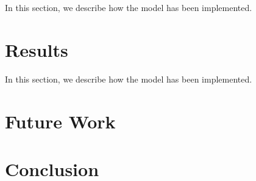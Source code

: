 \documentclass[11pt,headings=small]{scrartcl}
\begin{document}
In this section, we describe how the model has been implemented.

\section{Results}
\label{section:Res}

In this section, we describe how the model has been implemented.

\section{Future Work}
\label{section:Future}

\section{Conclusion}
\label{section:Concl}



\end{document}
